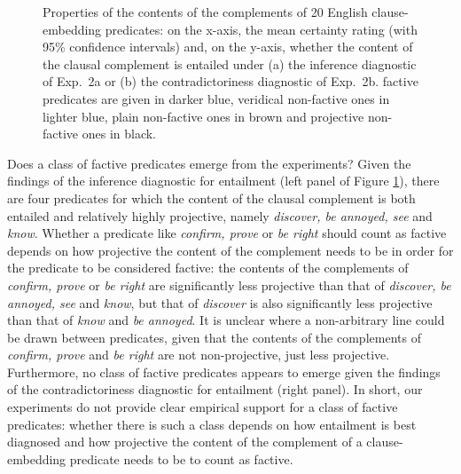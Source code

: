 \documentclass[11pt,fleqn]{article}
\newcommand{\6}{\mbox{$[\hspace*{-.6mm}[$}}
\newcommand{\9}{\mbox{$]\hspace*{-.6mm}]$}}
\begin{document}
{\begin{figure}[h]
\caption{Properties of the contents of the complements of 20 English clause-embedding predicates: on the x-axis, the mean certainty rating (with 95\% confidence intervals) and, on the y-axis, whether the content of the clausal complement is entailed under (a) the inference diagnostic of Exp.~2a or (b) the contradictoriness diagnostic of Exp.~2b. factive predicates are given in darker blue, veridical non-factive ones in lighter blue, plain non-factive ones in brown and projective non-factive ones in black.}\label{f-summary-categorical}

\end{figure}

Does a class of factive predicates emerge from the experiments? Given the findings of the inference diagnostic for entailment (left panel of Figure \ref{f-summary-categorical}), there are four predicates for which the content of the clausal complement is both entailed and relatively highly projective, namely {\em discover, be annoyed, see} and {\em know}. Whether a predicate like {\em confirm, prove} or {\em be right} should count as factive depends on how projective the content of the complement needs to be in order for the predicate to be considered factive: the contents of the complements of {\em confirm, prove} or {\em be right} are significantly less projective than that of {\em discover, be annoyed, see} and {\em know}, but that of {\em discover} is also significantly less projective than that of {\em know} and {\em be annoyed}. It is unclear where a non-arbitrary line could be drawn between predicates, given that the contents of the complements of {\em confirm, prove} and {\em be right} are not non-projective, just less projective. Furthermore, no class of factive predicates appears to emerge given the findings of the  contradictoriness diagnostic for entailment (right panel). In short, our experiments do not provide clear empirical support for a class of factive predicates: whether there is such a class depends on how entailment is best diagnosed and how projective the content of the complement of a clause-embedding predicate needs to be to count as factive.

}
\end{document}
